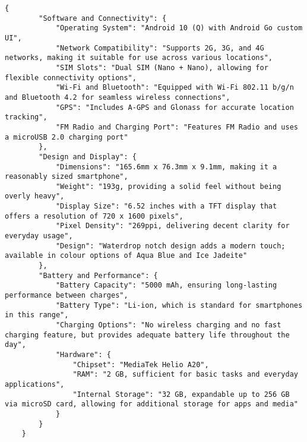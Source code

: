     \begin{figure*}[ht]
    \begin{lstlisting}[style=reviews, frame = single, caption=Output generated with GPT-4o-mini., label=code:JSON-GPT4]
    {
        "Software and Connectivity": {
            "Operating System": "Android 10 (Q) with Android Go custom UI",
            "Network Compatibility": "Supports 2G, 3G, and 4G networks, making it suitable for use across various locations",
            "SIM Slots": "Dual SIM (Nano + Nano), allowing for flexible connectivity options",
            "Wi-Fi and Bluetooth": "Equipped with Wi-Fi 802.11 b/g/n and Bluetooth 4.2 for seamless wireless connections",
            "GPS": "Includes A-GPS and Glonass for accurate location tracking",
            "FM Radio and Charging Port": "Features FM Radio and uses a microUSB 2.0 charging port"
        },
        "Design and Display": {
            "Dimensions": "165.6mm x 76.3mm x 9.1mm, making it a reasonably sized smartphone",
            "Weight": "193g, providing a solid feel without being overly heavy",
            "Display Size": "6.52 inches with a TFT display that offers a resolution of 720 x 1600 pixels",
            "Pixel Density": "269ppi, delivering decent clarity for everyday usage",
            "Design": "Waterdrop notch design adds a modern touch; available in colour options of Aqua Blue and Ice Jadeite"
        },
        "Battery and Performance": {
            "Battery Capacity": "5000 mAh, ensuring long-lasting performance between charges",
            "Battery Type": "Li-ion, which is standard for smartphones in this range",
            "Charging Options": "No wireless charging and no fast charging feature, but provides adequate battery life throughout the day",
            "Hardware": {
                "Chipset": "MediaTek Helio A20",
                "RAM": "2 GB, sufficient for basic tasks and everyday applications",
                "Internal Storage": "32 GB, expandable up to 256 GB via microSD card, allowing for additional storage for apps and media"
            }
        }
    }
    \end{lstlisting}
    \end{figure*}
    
